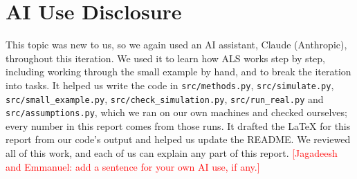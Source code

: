 \documentclass[11pt]{article}
\theoremstyle{definition}
\newcommand{\code}[1]{\texttt{#1}}
\newcommand{\tbd}[1]{\textcolor{red}{[#1]}}
\begin{document}
\section*{AI Use Disclosure}

{\sloppy This topic was new to us, so we again used an AI assistant, Claude (Anthropic), throughout this
iteration. We used it to learn how ALS works step by step, including working through the small
example by hand, and to break the iteration into tasks. It helped us write the code in
\code{src/methods.py}, \code{src/simulate.py}, \code{src/small\_example.py},
\code{src/check\_simulation.py}, \code{src/run\_real.py} and \code{src/assumptions.py}, which we ran
on our own machines and checked ourselves; every number in this report comes from those runs. It
drafted the \LaTeX{} for this report from our code's output and helped us update the README. We
reviewed all of this work, and each of us can explain any part of this report.
\tbd{Jagadeesh and Emmanuel: add a sentence for your own AI use, if any.}\par}
\end{document}
